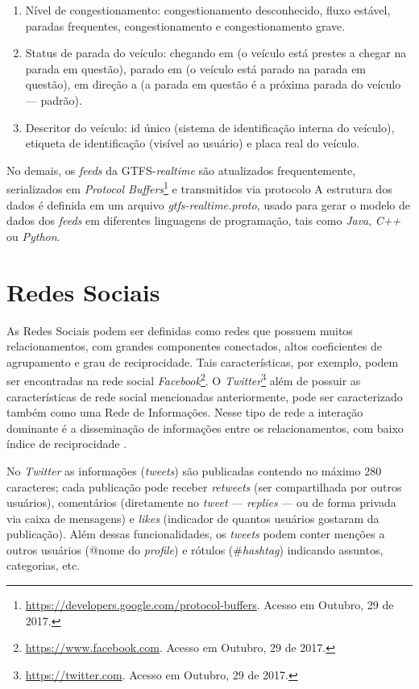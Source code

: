 \documentclass[
	12pt,				%
	oneside,			%
	a4paper,			%
	english,			%
	brazil				%
	]{abntex2ppgsi}
\begin{document}
\begin{enumerate}
\begin{enumerate}
\item Nível de congestionamento: congestionamento desconhecido, fluxo estável, paradas frequentes, congestionamento e congestionamento grave.
\item Status de parada do veículo: chegando em (o veículo está prestes a chegar na parada em questão), parado em (o veículo está parado na parada em questão), em direção a (a parada em questão é a próxima parada do veículo --- padrão). 
\item Descritor do veículo: id único (sistema de identificação interna do veículo), etiqueta de identificação (visível ao usuário) e placa real do veículo.
\end{enumerate}
\end{enumerate}

No demais, os \textit{feeds} da GTFS-\textit{realtime} são atualizados frequentemente, serializados em \textit{Protocol Buffers}\footnote{\url{https://developers.google.com/protocol-buffers}. Acesso em Outubro, 29 de 2017.} e transmitidos via protocolo  A estrutura dos dados é definida em um arquivo \textit{gtfs-realtime.proto}, usado para gerar o modelo de dados dos \textit{feeds} em diferentes linguagens de programação, tais como \textit{Java}, \textit{C++} ou \textit{Python}.

\clearpage

\section{Redes Sociais}
\label{sns}

As Redes Sociais podem ser definidas como redes que possuem muitos relacionamentos, com grandes componentes conectados, altos coeficientes de agrupamento e grau de reciprocidade. Tais características, por exemplo, podem ser encontradas na rede social \textit{Facebook}\footnote{\url{https://www.facebook.com}. Acesso em Outubro, 29 de 2017.}. O \textit{Twitter}\footnote{\url{https://twitter.com}. Acesso em Outubro, 29 de 2017.} além de possuir as características de rede social mencionadas anteriormente, pode ser caracterizado também como uma Rede de Informações. Nesse tipo de rede a interação dominante é a disseminação de informações entre os relacionamentos, com baixo índice de reciprocidade \cite{myers2014information}.

No \textit{Twitter} as informações (\textit{tweets}) são publicadas contendo no máximo 280 caracteres; cada publicação pode receber \textit{retweets} (ser compartilhada por outros usuários), comentários (diretamente no \textit{tweet} --- \textit{replies} ---  ou de forma privada via caixa de mensagens) e \textit{likes} (indicador de quantos usuários gostaram da publicação). Além dessas funcionalidades, os \textit{tweets} podem conter menções a outros usuários (@nome do \textit{profile}) e rótulos (\#\textit{hashtag}) indicando assuntos, categorias, etc.
\end{document}
